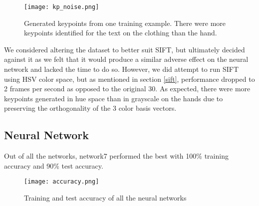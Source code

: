 \begin{figure}[h]
\texttt{[image: kp\_noise.png]}
\centering
\caption{Generated keypoints from one training example. There were more keypoints identified for the text on the clothing than the hand.}
\label{kp_noise}
\end{figure}

We considered altering the dataset to better suit SIFT, but ultimately decided against it as we felt that it would produce a similar adverse effect on the neural network and lacked the time to do so. However, we did attempt to run SIFT using HSV color space, but as mentioned in section \ref{sift}, performance dropped to 2 frames per second as opposed to the original 30. As expected, there were more keypoints generated in hue space than in grayscale on the hands due to preserving the orthogonality of the 3 color basis vectors.

\subsection{Neural Network}
\label{perf_NN}
Out of all the networks, network7 performed the best with 100\% training accuracy and 90\% test accuracy.

\begin{figure}[h]
\texttt{[image: accuracy.png]}
\centering
\caption{Training and test accuracy of all the neural networks}
\end{figure}